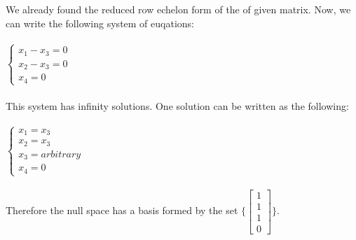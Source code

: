 \documentclass[fleqn]{article}
\begin{document}
\begin{enumerate}
{        \\
        \\
        We already found the reduced row echelon form of the of given matrix. Now, we can write the
        following system of euqations:
        \\
        \\
        $
            \begin{cases}
              x_1-x_3=0
              \\
              x_2-x_3=0
              \\
              x_4=0
            \end{cases}
        $
        \\
        \\
        This system has infinity solutions. One solution can be written as the following:
        \\
        \\
        $
          \begin{cases}
            x_1=x_3
            \\
            x_2=x_3
            \\
            x_3=arbitrary
            \\
            x_4=0
          \end{cases}
        $
        \\
        \\
        Therefore the null space has a basis formed by the set 
        $
          \{
            \begin{bmatrix}
              1
              \\
              1
              \\
              1
              \\
              0
            \end{bmatrix}
          \} 
        $.
      }

  \end{enumerate}
\end{document}
